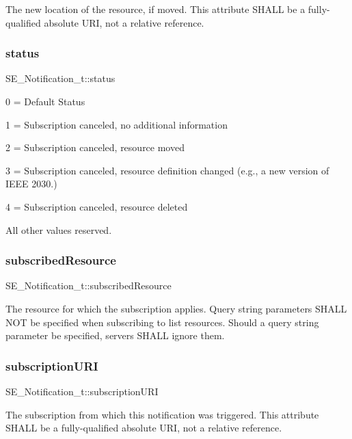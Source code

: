 The new location of the resource, if moved. This attribute S\+H\+A\+LL be a fully-\/qualified absolute U\+RI, not a relative reference. \mbox{\label{group__Notification_ga5ed1873d82ef9cabb0b98af44f0a3cc1}} 
\subsubsection{\texorpdfstring{status}{status}}
{\footnotesize\ttfamily S\+E\+\_\+\+Notification\+\_\+t\+::status}

0 = Default Status

1 = Subscription canceled, no additional information

2 = Subscription canceled, resource moved

3 = Subscription canceled, resource definition changed (e.\+g., a new version of I\+E\+EE 2030.)

4 = Subscription canceled, resource deleted

All other values reserved. \mbox{\label{group__Notification_ga80e27fbceef2bc002f54d227f0815df6}} 
\subsubsection{\texorpdfstring{subscribed\+Resource}{subscribedResource}}
{\footnotesize\ttfamily S\+E\+\_\+\+Notification\+\_\+t\+::subscribed\+Resource}

The resource for which the subscription applies. Query string parameters S\+H\+A\+LL N\+OT be specified when subscribing to list resources. Should a query string parameter be specified, servers S\+H\+A\+LL ignore them. \mbox{\label{group__Notification_gacd85c02c4ba0556285ab3f8544b31f96}} 
\subsubsection{\texorpdfstring{subscription\+U\+RI}{subscriptionURI}}
{\footnotesize\ttfamily S\+E\+\_\+\+Notification\+\_\+t\+::subscription\+U\+RI}

The subscription from which this notification was triggered. This attribute S\+H\+A\+LL be a fully-\/qualified absolute U\+RI, not a relative reference. 
